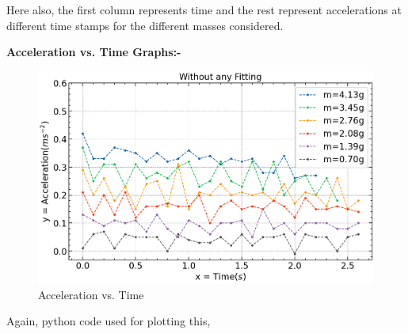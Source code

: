 \documentclass{article}
\begin{document}
 	 Here also, the first column represents time and the rest represent accelerations at different time stamps for the different masses considered.
 	 
 	 \pagebreak
 
 	\textbf{Acceleration vs. Time Graphs:-}
 	
 	\begin{figure}[H]
 		\centering
 		\includegraphics[scale=0.7]{acc vs. time (no-fit).png}
 		\caption{Acceleration vs. Time}
 		\label{figure:acctimenf}%
 	\end{figure}
 
 	Again, python code used for plotting this,
 	
\end{document}
